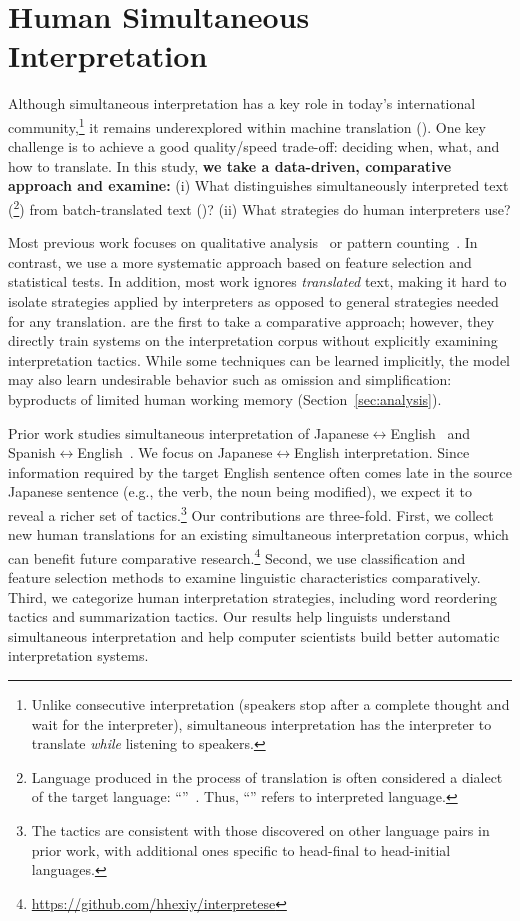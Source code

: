 \section{Human Simultaneous Interpretation}
\label{sec:intro}

Although simultaneous interpretation has a key role in today's international
community,\footnote{Unlike consecutive interpretation (speakers stop
  after a complete thought and wait for the interpreter), simultaneous
  interpretation has the interpreter to translate \emph{while}
  listening to speakers.} it remains underexplored within machine
translation ().  One key challenge is to achieve a good
quality/speed trade-off: deciding when, what, and how to translate.
In this study, \textbf{we take a data-driven, comparative approach and
  examine:} (i) What distinguishes simultaneously interpreted text
(\inter{}\footnote{Language produced in the
  process of translation is often considered a dialect of the target
  language: ``\trans{}''~\cite{translationese}.  Thus,
  ``\inter{}'' refers to interpreted language.})
from batch-translated text (\trans{})?  (ii) What strategies do human
interpreters use?

Most previous work focuses on qualitative
analysis~\cite{epic,erik11theory,shimizu14corpus} or pattern
counting~\cite{tohyama06lrec,att13speech}.  In contrast, we use a more
systematic approach based on feature selection and statistical tests.
In addition, most work ignores \emph{translated} text, making it hard
to isolate strategies applied by interpreters as opposed to general
strategies needed for any translation.   are
the first to take a comparative approach; however, they directly train
 systems on the interpretation corpus without explicitly
examining interpretation tactics.  While some techniques can be
learned implicitly, the model may also learn undesirable behavior such
as omission and simplification: byproducts of limited human working
memory (Section~\ref{sec:analysis}).

Prior work studies simultaneous interpretation of
Japanese$\leftrightarrow$English~\cite{tohyama06lrec,shimizu14corpus}
and Spanish$\leftrightarrow$English~\cite{att13speech}.  We focus on
Japanese$\leftrightarrow$English interpretation.  Since information
required by the target English sentence often comes late in the source
Japanese sentence (e.g., the verb, the noun being modified), we expect
it to reveal a richer set of tactics.\footnote{The tactics are
  consistent with those discovered on other language pairs in prior
  work, with additional ones specific to head-final to head-initial
  languages.}  Our contributions are three-fold.  First, we collect
new human translations for an existing simultaneous interpretation
corpus, which can benefit future comparative
research.\footnote{\url{https://github.com/hhexiy/interpretese}}
Second, we use classification and feature selection methods to examine
linguistic characteristics comparatively.  Third, we categorize human
interpretation strategies, including word reordering tactics and
summarization tactics.  Our results help linguists understand
simultaneous interpretation and help computer scientists build better
automatic interpretation systems.
